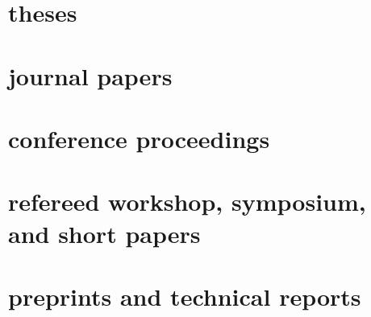 \documentclass[4pt, letterpaper]{article}
\begin{document}
\section*{theses}
\begin{refsection}
\nocite{*}
\printbibliography[heading=none]
\end{refsection}

\section*{journal papers}
\begin{refsection}
\nocite{*}
\printbibliography[heading=none]
\end{refsection}

\section*{conference proceedings}
\begin{refsection}
\nocite{*}
\printbibliography[heading=none]
\end{refsection}

\section*{refereed workshop, symposium, and short papers}
\begin{refsection}
\nocite{*}
\printbibliography[heading=none]
\end{refsection}

\section*{preprints and technical reports}
\begin{refsection}
\nocite{*}
\printbibliography[heading=none]
\end{refsection}

\end{document}
